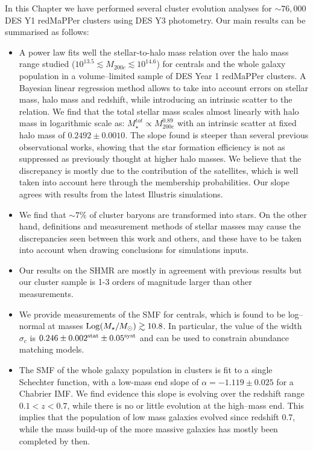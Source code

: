 {In this Chapter we have performed several cluster evolution analyses for $\sim 76,000$ DES Y1 redMaPPer clusters using DES Y3 photometry. Our main results can be summarised as follows:

\begin{itemize}

\item A power law fits well the stellar-to-halo mass relation over the halo mass range studied ($10^{13.5} \lesssim M_{200c}\lesssim 10^{14.6}$) for centrals and the whole galaxy population in a volume--limited sample of DES Year 1 redMaPPer clusters. A Bayesian linear regression method allows to take into account errors on stellar mass, halo mass and redshift, while introducing an intrinsic scatter to the relation. We find that the total stellar mass scales almost linearly with halo mass in logarithmic scale as: $M_\star^{tot}\propto M_{200c}^{0.89}$ with an intrinsic scatter at fixed halo mass of $0.2492\pm 0.0010$. The slope found is steeper than several previous observational works, showing that the star formation efficiency is not as suppressed as previously thought at higher halo masses. We believe that the discrepancy is mostly due to the contribution of the satellites, which is well taken into account here through the membership probabilities. Our slope agrees with results from the latest Illustris simulations.

\item We find that $\sim 7\%$ of cluster baryons are transformed into stars. On the other hand, definitions and measurement methods of stellar masses may cause the discrepancies seen between this work and others, and these have to be taken into account when drawing conclusions for simulations inputs. 

\item Our results on the SHMR are mostly in agreement with previous results but our cluster sample is 1-3 orders of magnitude larger than other measurements.

\item We provide measurements of the SMF for centrals, which is found to be log--normal at masses ${\rm Log} (M_\star/M_\odot) \gtrsim 10.8$. In particular, the value of the width $\sigma_c$ is $0.246  \pm 0.002^{\rm stat}\pm 0.05^{\rm syst}$ and can be used to constrain abundance matching models. 

\item The SMF of the whole galaxy population in clusters is fit to a single Schechter function, with a low-mass end slope of  $\alpha=-1.119\pm0.025$ for a Chabrier IMF. We find evidence this slope is evolving over the redshift range $0.1<z<0.7$, while there is no or little evolution at the high--mass end. This implies that the population of low mass galaxies evolved since redshift 0.7, while the mass build-up of the more massive galaxies has mostly been completed by then. 


\end{itemize}}

